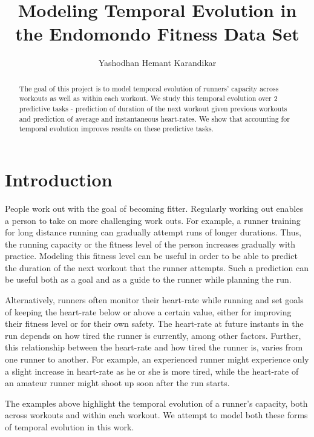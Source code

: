 \documentclass{acm_proc_article-sp}
\begin{document}
\title{Modeling Temporal Evolution in the Endomondo Fitness Data Set}
%
%
\author{
\alignauthor
Yashodhan Hemant Karandikar\\
}

\maketitle
\begin{abstract}
The goal of this project is to model temporal evolution of runners' capacity across workouts as well as within each workout. We study this temporal evolution over 2 predictive tasks - prediction of duration of the next workout given previous workouts and prediction of average and instantaneous heart-rates. We show that accounting for temporal evolution improves results on these predictive tasks.
\end{abstract}

\section{Introduction}
People work out with the goal of becoming fitter. Regularly working out enables a person to take on more challenging work outs. For example, a runner training for long distance running can gradually attempt runs of longer durations. Thus, the running capacity or the fitness level of the person increases gradually with practice. Modeling this fitness level can be useful in order to be able to predict the duration of the next workout that the runner attempts. Such a prediction can be useful both as a goal and as a guide to the runner while planning the run.

Alternatively, runners often monitor their heart-rate while running and set goals of keeping the heart-rate below or above a certain value, either for improving their fitness level or for their own safety. The heart-rate at future instants in the run depends on how tired the runner is currently, among other factors. Further, this relationship between the heart-rate and how tired the runner is, varies from one runner to another. For example, an experienced runner might experience only a slight increase in heart-rate as he or she is more tired, while the heart-rate of an amateur runner might shoot up soon after the run starts.

The examples above highlight the temporal evolution of a runner's capacity, both across workouts and within each workout. We attempt to model both these forms of temporal evolution in this work.
\end{document}
